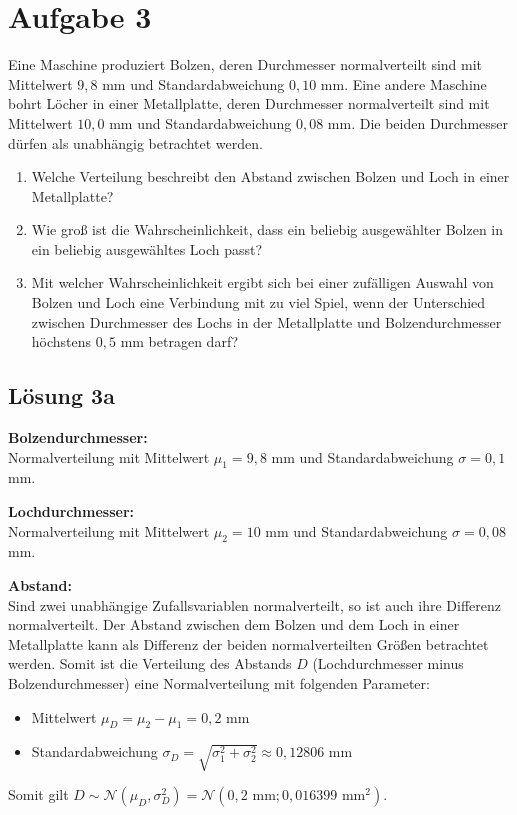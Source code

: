 \documentclass[main.tex]{subfiles}
\begin{document}
\section{Aufgabe 3}
Eine Maschine produziert Bolzen, deren Durchmesser normalverteilt sind mit Mittelwert $9,8$ mm und Standardabweichung $0,10$ mm. Eine andere Maschine bohrt Löcher in einer
Metallplatte, deren Durchmesser normalverteilt sind mit Mittelwert $10,0$ mm und Standardabweichung $0,08$ mm. Die beiden Durchmesser dürfen als unabhängig betrachtet werden.
\begin{enumerate}
\item Welche Verteilung beschreibt den Abstand zwischen Bolzen und Loch in einer Metallplatte?
\item Wie groß ist die Wahrscheinlichkeit, dass ein beliebig ausgewählter Bolzen in ein beliebig ausgewähltes Loch passt?
\item Mit welcher Wahrscheinlichkeit ergibt sich bei einer zufälligen Auswahl von Bolzen und Loch eine Verbindung mit zu viel Spiel, wenn der Unterschied zwischen
Durchmesser des Lochs in der Metallplatte und Bolzendurchmesser höchstens $0,5$ mm betragen darf?
\end{enumerate}

\subsection{Lösung 3a}

\textbf{Bolzendurchmesser:}\\
Normalverteilung mit Mittelwert $\mu_1 = 9,8$ mm und Standardabweichung $\sigma = 0,1$ mm.

\textbf{Lochdurchmesser:}\\
Normalverteilung mit Mittelwert $\mu_2 = 10$ mm und Standardabweichung $\sigma = 0,08$ mm.

\textbf{Abstand:}\\
Sind zwei unabhängige Zufallsvariablen normalverteilt, so ist auch ihre Differenz normalverteilt. Der Abstand zwischen dem Bolzen und dem Loch in einer Metallplatte kann als Differenz der beiden normalverteilten Größen betrachtet werden. Somit ist die Verteilung des Abstands $D$ (Lochdurchmesser minus Bolzendurchmesser) eine Normalverteilung mit folgenden Parameter:
\begin{itemize}
    \item Mittelwert $\mu_D = \mu_2 - \mu_1 =0,2$ mm
    \item Standardabweichung $\sigma_D = \sqrt{\sigma_1^2 + \sigma_2^2} \approx 0,12806$ mm
\end{itemize}
Somit gilt $D\sim\mathcal{N}(\mu_D, \sigma_D^2) = \mathcal{N}(0,2\mbox{ mm}; 0,016399\mbox{ mm}^2)$.
\end{document}
